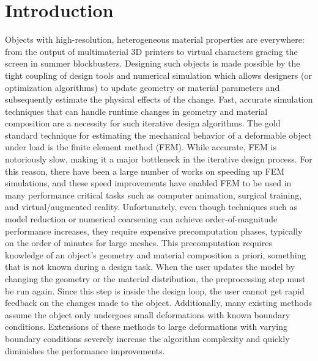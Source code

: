 \section{Introduction}
Objects with high-resolution, heterogeneous material properties are everywhere:
from the output of multimaterial 3D printers 
to virtual characters gracing the screen in summer blockbusters.
Designing such objects is made possible by the tight coupling of design
tools and numerical simulation which allows designers 
(or optimization algorithms) to update geometry or material parameters 
and subsequently estimate the physical effects of the change.
Fast, accurate simulation techniques that can handle runtime changes 
in geometry and material composition are a necessity for such iterative design algorithms.
The gold standard technique for estimating the mechanical behavior
of a deformable object under load is the finite element method (FEM).
While accurate, FEM is notoriously slow,
making it a major bottleneck in the iterative design process.
For this reason, there have been a large number of works on speeding up FEM simulations,
and these speed improvements have enabled FEM to be used in many performance critical tasks
such as computer animation, surgical training, and virtual/augmented reality.
Unfortunately, even though techniques such as model reduction or numerical coarsening 
can achieve order-of-magnitude performance increases,
they require expensive precomputation phases, typically on the order of minutes
for large meshes. This precomputation requires knowledge of an object’s 
geometry and material composition a priori,
something that is not known during a design task.
When the user updates the model by changing the geometry or the material distribution,
the preprocessing step must be run again.
Since this step is inside the design loop,
the user cannot get rapid feedback on the changes made to the object.
Additionally, many existing methods assume the object only undergoes small deformations
with known boundary conditions.
Extensions of these methods to large deformations with varying boundary conditions
severely increase the algorithm complexity and quickly diminishes the performance improvements.

